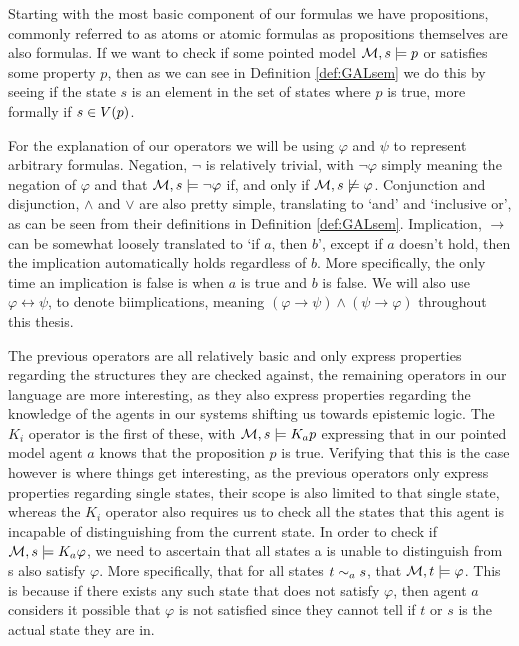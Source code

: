 
Starting with the most basic component of our formulas we have propositions, commonly referred to as atoms or atomic formulas as propositions themselves are also formulas. If we want to check if some pointed model $\mathcal{M},s \models p$ or satisfies some property $p$, then as we can see in Definition \ref{def:GALsem} we do this by seeing if the state $s$ is an element in the set of states where $p$ is true, more formally if $s \in V(p)$. 

For the explanation of our operators we will be using $\varphi$ and $\psi$ to represent arbitrary formulas. Negation, $\neg$ is relatively trivial, with $\neg\varphi$ simply meaning the negation of $\varphi$ and that $\mathcal{M},s \models \neg\varphi$ if, and only if $\mathcal{M},s \not\models\varphi$. Conjunction and disjunction, $\wedge$ and $\vee$ are also pretty simple, translating to `and' and `inclusive or', as can be seen from their definitions in Definition \ref{def:GALsem}. Implication, $\rightarrow$ can be somewhat loosely translated to `if $a$, then $b$', except if $a$ doesn't hold, then the implication automatically holds regardless of $b$. More specifically, the only time an implication is false is when $a$ is true and $b$ is false. We will also use $\varphi \leftrightarrow \psi$, to denote biimplications, meaning $(\varphi \rightarrow \psi) \wedge (\psi \rightarrow \varphi)$ throughout this thesis. 

The previous operators are all relatively basic and only express properties regarding the structures they are checked against, the remaining operators in our language are more interesting, as they also express properties regarding the knowledge of the agents in our systems shifting us towards epistemic logic. The $K_i$ operator is the first of these, with $\mathcal{M} ,s \models K_ap$ expressing that in our pointed model agent $a$ knows that the proposition $p$ is true. Verifying that this is the case however is where things get interesting, as the previous operators only express properties regarding single states, their scope is also limited to that single state, whereas the $K_i$ operator also requires us to check all the states that this agent is incapable of distinguishing from the current state. In order to check if $\mathcal{M},s \models K_a\varphi$, we need to ascertain that all states a is unable to distinguish from s also satisfy $\varphi$. More specifically, that for all states $t\sim_as$, that $\mathcal{M},t \models\varphi$. This is because if there exists any such state that does not satisfy $\varphi$, then agent $a$ considers it possible that $\varphi$ is not satisfied since they cannot tell if $t$ or $s$ is the actual state they are in.

